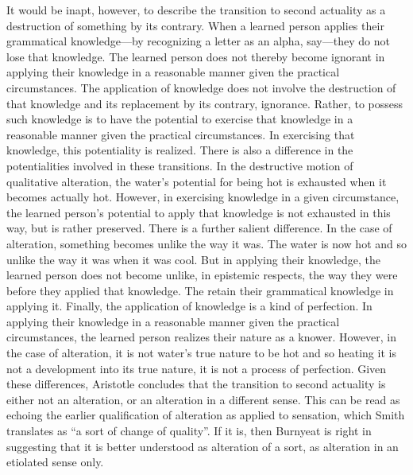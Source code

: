 It would be inapt, however, to describe the transition to second actuality as a destruction of something by its contrary. When a learned person applies their grammatical knowledge---by recognizing a letter as an alpha, say---they do not lose that knowledge. The learned person does not thereby become ignorant in applying their knowledge in a reasonable manner given the practical circumstances. The application of knowledge does not involve the destruction of that knowledge and its replacement by its contrary, ignorance. Rather, to possess such knowledge is to have the potential to exercise that knowledge in a reasonable manner given the practical circumstances. In exercising that knowledge, this potentiality is realized. There is also a difference in the potentialities involved in these transitions. In the destructive motion of qualitative alteration, the water's potential for being hot is exhausted when it becomes actually hot. However, in exercising knowledge in a given circumstance, the learned person's potential to apply that knowledge is not exhausted in this way, but is rather preserved. There is a further salient difference. In the case of alteration, something becomes unlike the way it was. The water is now hot and so unlike the way it was when it was cool. But in applying their knowledge, the learned person does not become unlike, in epistemic respects, the way they were before they applied that knowledge. The retain their grammatical knowledge in applying it. Finally, the application of knowledge is a kind of perfection. In applying their knowledge in a reasonable manner given the practical circumstances, the learned person realizes their nature as a knower. However, in the case of alteration, it is not water's true nature to be hot and so heating it is not a development into its true nature, it is not a process of perfection. Given these differences, Aristotle concludes that the transition to second actuality is either not an alteration, or an alteration in a different sense. This can be read as echoing the earlier qualification of alteration as applied to sensation, which Smith translates as ``a sort of change of quality''. If it is, then Burnyeat is right in suggesting that it is better understood as alteration of a sort, as alteration in an etiolated sense only.

